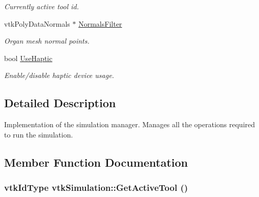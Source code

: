 \begin{DoxyCompactItemize}
\begin{DoxyCompactList}\small\item\em Currently active tool id. \item\end{DoxyCompactList}\item 
\hypertarget{classvtkSimulation_a0d962352d6b39be833179e572bb5ca48}{
vtkPolyDataNormals $\ast$ \hyperlink{classvtkSimulation_a0d962352d6b39be833179e572bb5ca48}{NormalsFilter}}
\label{classvtkSimulation_a0d962352d6b39be833179e572bb5ca48}

\begin{DoxyCompactList}\small\item\em Organ mesh normal points. \item\end{DoxyCompactList}\item 
\hypertarget{classvtkSimulation_afd9fd6366920c569515356d88d6936ee}{
bool \hyperlink{classvtkSimulation_afd9fd6366920c569515356d88d6936ee}{UseHaptic}}
\label{classvtkSimulation_afd9fd6366920c569515356d88d6936ee}

\begin{DoxyCompactList}\small\item\em Enable/disable haptic device usage. \item\end{DoxyCompactList}\end{DoxyCompactItemize}


\subsection{Detailed Description}
Implementation of the simulation manager. Manages all the operations required to run the simulation. 

\subsection{Member Function Documentation}
\hypertarget{classvtkSimulation_a832386edded984585c69bcdaf4800f60}{
\subsubsection[{GetActiveTool}]{\setlength{\rightskip}{0pt plus 5cm}vtkIdType vtkSimulation::GetActiveTool ()}}
\label{classvtkSimulation_a832386edded984585c69bcdaf4800f60}



